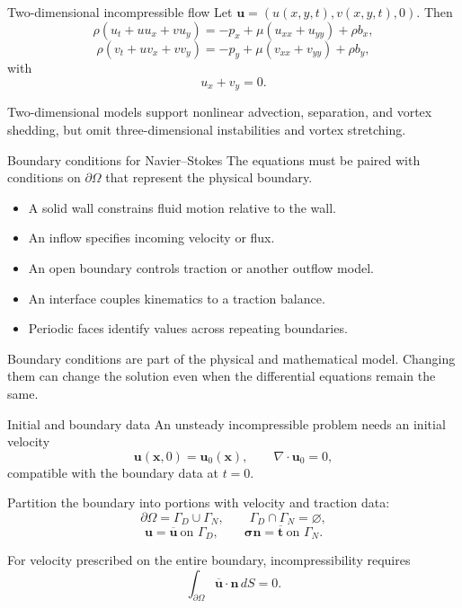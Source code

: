 \documentclass[aspectratio=169,11pt]{beamer}
\newcommand{\uvec}{\bm{u}}
\newcommand{\xvec}{\bm{x}}
\newcommand{\nvec}{\bm{n}}
\newcommand{\tvec}{\bm{t}}
\newcommand{\stress}{\bm{\sigma}}
\begin{document}
\begin{frame}{Two-dimensional incompressible flow}
Let $\uvec=(u(x,y,t),v(x,y,t),0)$. Then
\[
  \rho(u_t+u u_x+v u_y)
  =-p_x+\mu(u_{xx}+u_{yy})+\rho b_x,
\]
\[
  \rho(v_t+u v_x+v v_y)
  =-p_y+\mu(v_{xx}+v_{yy})+\rho b_y,
\]
with
\[
  \boxed{u_x+v_y=0}.
\]
\begin{punchbox}
\small Two-dimensional models support nonlinear advection, separation, and vortex shedding, but omit three-dimensional instabilities and vortex stretching.
\end{punchbox}
\end{frame}

\begin{frame}{Boundary conditions for Navier--Stokes}
The equations must be paired with conditions on $\partial\Omega$ that represent the physical boundary.
\begin{itemize}\itemsep7pt
  \item A solid wall constrains fluid motion relative to the wall.
  \item An inflow specifies incoming velocity or flux.
  \item An open boundary controls traction or another outflow model.
  \item An interface couples kinematics to a traction balance.
  \item Periodic faces identify values across repeating boundaries.
\end{itemize}
\begin{punchbox}
\small Boundary conditions are part of the physical and mathematical model. Changing them can change the solution even when the differential equations remain the same.
\end{punchbox}
\end{frame}

\begin{frame}{Initial and boundary data}
An unsteady incompressible problem needs an initial velocity
\[
  \uvec(\xvec,0)=\uvec_0(\xvec),
  \qquad
  \nabla\cdot\uvec_0=0,
\]
compatible with the boundary data at $t=0$.

Partition the boundary into portions with velocity and traction data:
\[
  \partial\Omega=\Gamma_D\cup\Gamma_N,
  \qquad
  \Gamma_D\cap\Gamma_N=\varnothing,
\]
\[
  \uvec=\overline{\uvec}
  \ \text{on }\Gamma_D,
  \qquad
  \stress\nvec=\overline{\tvec}
  \ \text{on }\Gamma_N.
\]

For velocity prescribed on the entire boundary, incompressibility requires
\[
  \int_{\partial\Omega}\overline{\uvec}\cdot\nvec\,dS=0.
\]
\end{frame}
\end{document}
